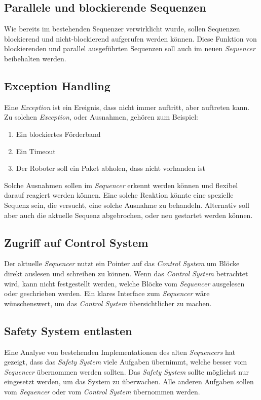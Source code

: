 \subsection{Parallele und blockierende Sequenzen}
Wie bereits im bestehenden Sequenzer verwirklicht wurde, sollen Sequenzen blockierend und nicht-blockierend aufgerufen werden können.
Diese Funktion von blockierenden und parallel ausgeführten Sequenzen soll auch im neuen \textit{Sequencer} beibehalten werden.
 

\subsection{Exception Handling}
Eine \textit{Exception} ist ein Ereignis, dass nicht immer auftritt, aber auftreten kann.
Zu solchen \textit{Exception}, oder Ausnahmen, gehören zum Beispiel:
\begin{enumerate}
\item Ein blockiertes Förderband
\item Ein Timeout
\item Der Roboter soll ein Paket abholen, dass nicht vorhanden ist
\end{enumerate}
Solche Ausnahmen sollen im \textit{Sequencer} erkennt werden können und flexibel darauf reagiert werden können.
Eine solche Reaktion könnte eine spezielle Sequenz sein, die versucht, eine solche Ausnahme zu behandeln.
Alternativ soll aber auch die aktuelle Sequenz abgebrochen, oder neu gestartet werden können.


\subsection{Zugriff auf Control System}
Der aktuelle \textit{Sequencer} nutzt ein Pointer auf das \textit{Control System} um Blöcke direkt auslesen und schreiben zu können.
Wenn das \textit{Control System} betrachtet wird, kann nicht festgestellt werden, welche Blöcke vom \textit{Sequencer} ausgelesen oder geschrieben werden.
Ein klares Interface zum \textit{Sequencer} wäre wünschenswert, um das \textit{Control System} übersichtlicher zu machen.


\subsection{Safety System entlasten}
Eine Analyse von bestehenden Implementationen des alten \textit{Sequencers} hat gezeigt, dass das \textit{Safety System} viele Aufgaben übernimmt, welche besser vom \textit{Sequencer} übernommen werden sollten.
Das \textit{Safety System} sollte möglichst nur eingesetzt werden, um das System zu überwachen.
Alle anderen Aufgaben sollen vom \textit{Sequencer} oder vom \textit{Control System} übernommen werden.



